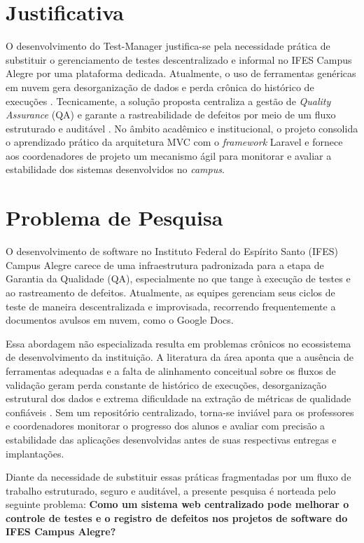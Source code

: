 \section{Justificativa}

O desenvolvimento do Test-Manager justifica-se pela necessidade prática de substituir o gerenciamento de testes descentralizado e informal no IFES Campus Alegre por uma plataforma dedicada. Atualmente, o uso de ferramentas genéricas em nuvem gera desorganização de dados e perda crônica do histórico de execuções \cite{medeiros2022, kokubum2025}. Tecnicamente, a solução proposta centraliza a gestão de \textit{Quality Assurance} (QA) e garante a rastreabilidade de defeitos por meio de um fluxo estruturado e auditável \cite{tebes2022}. No âmbito acadêmico e institucional, o projeto consolida o aprendizado prático da arquitetura MVC com o \textit{framework} Laravel \cite{subecz2021} e fornece aos coordenadores de projeto um mecanismo ágil para monitorar e avaliar a estabilidade dos sistemas desenvolvidos no \textit{campus}.

\section{Problema de Pesquisa}

O desenvolvimento de software no Instituto Federal do Espírito Santo (IFES) Campus Alegre carece de uma infraestrutura padronizada para a etapa de Garantia da Qualidade (QA), especialmente no que tange à execução de testes e ao rastreamento de defeitos. Atualmente, as equipes gerenciam seus ciclos de teste de maneira descentralizada e improvisada, recorrendo frequentemente a documentos avulsos em nuvem, como o Google Docs. 

Essa abordagem não especializada resulta em problemas crônicos no ecossistema de desenvolvimento da instituição. A literatura da área aponta que a ausência de ferramentas adequadas e a falta de alinhamento conceitual sobre os fluxos de validação geram perda constante de histórico de execuções, desorganização estrutural dos dados e extrema dificuldade na extração de métricas de qualidade confiáveis \cite{tebes2022, kokubum2025, medeiros2022}. Sem um repositório centralizado, torna-se inviável para os professores e coordenadores monitorar o progresso dos alunos e avaliar com precisão a estabilidade das aplicações desenvolvidas antes de suas respectivas entregas e implantações.

Diante da necessidade de substituir essas práticas fragmentadas por um fluxo de trabalho estruturado, seguro e auditável, a presente pesquisa é norteada pelo seguinte problema: \textbf{Como um sistema web centralizado pode melhorar o controle de testes e o registro de defeitos nos projetos de software do IFES Campus Alegre?}

